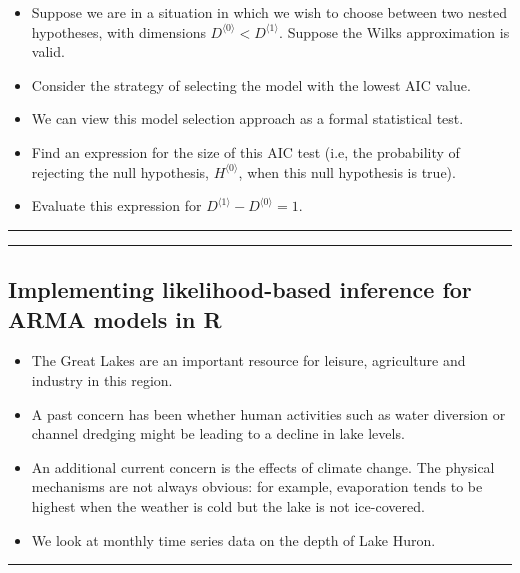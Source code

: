 \documentclass[]{article}
\begin{document}
\begin{itemize}
\item
  Suppose we are in a situation in which we wish to choose between two
  nested hypotheses, with dimensions
  \(D^{\langle 0\rangle}< D^{\langle 1\rangle}\). Suppose the Wilks
  approximation is valid.
\item
  Consider the strategy of selecting the model with the lowest AIC
  value.
\item
  We can view this model selection approach as a formal statistical
  test.
\item
  Find an expression for the size of this AIC test (i.e, the probability
  of rejecting the null hypothesis, \(H^{\langle 0\rangle}\), when this
  null hypothesis is true).
\item
  Evaluate this expression for
  \(D^{\langle 1\rangle} - D^{\langle 0\rangle}=1\).
\end{itemize}

\begin{center}\rule{0.5\linewidth}{\linethickness}\end{center}

\begin{center}\rule{0.5\linewidth}{\linethickness}\end{center}

\subsection{Implementing likelihood-based inference for ARMA models in
R}\label{implementing-likelihood-based-inference-for-arma-models-in-r}

\begin{itemize}
\item
  The Great Lakes are an important resource for leisure, agriculture and
  industry in this region.
\item
  A past concern has been whether human activities such as water
  diversion or channel dredging might be leading to a decline in lake
  levels.
\item
  An additional current concern is the effects of climate change. The
  physical mechanisms are not always obvious: for example, evaporation
  tends to be highest when the weather is cold but the lake is not
  ice-covered.
\item
  We look at monthly time series data on the depth of Lake Huron.
\end{itemize}

\begin{center}\rule{0.5\linewidth}{\linethickness}\end{center}
\end{document}
